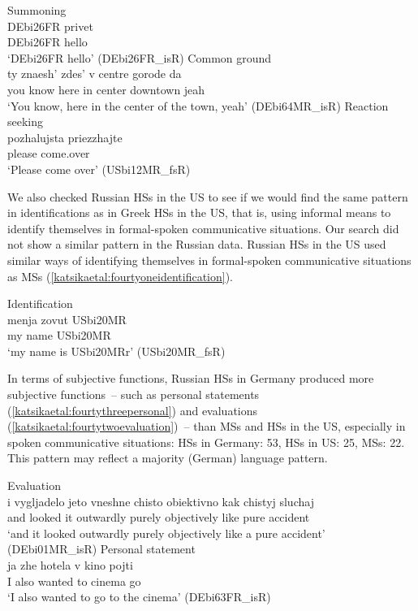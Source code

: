 \documentclass[output=paper,colorlinks,citecolor=brown]{langscibook}
\begin{document}
\ea Summoning\\ \label{katsikaetal:thirtyeightsummoning}
\gll DEbi26FR privet\\
     DEbi26FR hello\\
\glt ‘DEbi26FR hello’ (DEbi26FR\_isR)
\ex Common ground\\ \label{katsikaetal:thirtyninecommon}
\gll ty znaesh' zdes' v centre gorode da\\
     you know here in center downtown jeah\\
\glt ‘You know, here in the center of the town, yeah’ (DEbi64MR\_isR)
\ex Reaction seeking\\ \label{katsikaetal:fourtyreactionseek}
\gll pozhalujsta priezzhajte\\
     please come.over\\
\glt ‘Please come over’ (USbi12MR\_fsR)
\z

We also checked Russian HSs in the US to see if we would find the same pattern in identifications as in Greek HSs in the US, that is, using informal means to identify themselves in formal-spoken communicative situations. Our search did not show a similar pattern in the Russian data. Russian HSs in the US used similar ways of identifying themselves in formal-spoken communicative situations as MSs (\ref{katsikaetal:fourtyoneidentification}). 

\ea Identification\\ \label{katsikaetal:fourtyoneidentification}
\gll menja zovut USbi20MR\\
     my name USbi20MR\\
\glt ‘my name is USbi20MRr’ (USbi20MR\_fsR)
\z

In terms of subjective functions, Russian HSs in Germany produced more subjective functions~-- such as personal statements (\ref{katsikaetal:fourtythreepersonal}) and evaluations (\ref{katsikaetal:fourtytwoevaluation})~-- than MSs and HSs in the US, especially in spoken communicative situations: HSs in Germany: 53, HSs in US: 25, MSs: 22. This pattern may reflect a majority (German) language pattern. 

\ea Evaluation\\ \label{katsikaetal:fourtytwoevaluation}
\gll i vygljadelo jeto vneshne chisto obiektivno kak chistyj sluchaj\\
     and looked it outwardly purely objectively like pure accident\\
\glt ‘and it looked outwardly purely objectively like a pure accident’ (DEbi01MR\_isR)
\ex Personal statement\\ \label{katsikaetal:fourtythreepersonal}
\gll ja zhe hotela v kino pojti\\
     I also wanted to cinema go\\
\glt ‘I also wanted to go to the cinema’ (DEbi63FR\_isR)
\z
\end{document}
